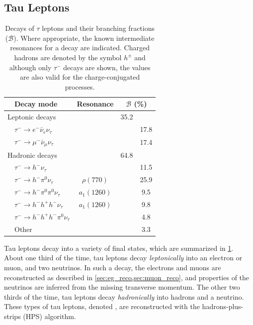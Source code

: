 \subsection{Tau Leptons}\label{sec:tau_reco}
\begin{table}
  \centering
  \begin{tabular}{llccc}
          \toprule
          & Decay mode & Resonance & \multicolumn{2}{c}{$\mathcal{B}$ (\%)} \\ 
          \midrule
          \multicolumn{2}{l}{Leptonic decays} & & 35.2 & \\
          & $\tau^- \to e^- \bar{\nu}_e \nu_\tau$ & & & 17.8 \\
          & $\tau^- \to \mu^- \bar{\nu}_\mu \nu_\tau$ & & & 17.4 \\
          \midrule
          \multicolumn{2}{l}{Hadronic decays} & & 64.8 & \\
          & $\tau^- \to h^- \nu_\tau$ & & & 11.5 \\
          & $\tau^- \to h^- \pi^0 \nu_\tau$ & $\rho(770)$ & & 25.9 \\
          & $\tau^- \to h^- \pi^0 \pi^0 \nu_\tau$ & $a_1(1260)$ & & 9.5 \\
          & $\tau^- \to h^-h^+h^ -\nu_\tau$ & $a_1(1260)$ & & 9.8 \\
          & $\tau^- \to h^-h^+h^- \pi^0 \nu_\tau$ & & & 4.8 \\
          & Other & & & 3.3 \\
          \bottomrule
  \end{tabular}
  \caption[Tau Lepton Decays and Branching Fractions]{Decays of $\tau$ leptons and their branching fractions ($\mathcal{B}$). Where appropriate, the known intermediate resonances for a decay are indicated. Charged hadrons are denoted by the symbol $h^\pm$ and although only $\tau^-$ decays are shown, the values are also valid for the charge-conjugated processes.}\label{tab:tau_decays}
\end{table}

Tau leptons decay into a variety of final states, which are summarized in \cref{tab:tau_decays}. About one third of the time, tau leptons decay \textit{leptonically} into an electron or muon, and two neutrinos. In such a decay, the electrons and muons are reconstructed as described in \cref{sec:eg_reco,sec:muon_reco}, and properties of the neutrinos are inferred from the missing transverse momentum. The other two thirds of the time, tau leptons decay \textit{hadronically} into hadrons and a neutrino. These types of tau leptons, denoted \tauh, are reconstructed with the hadrons-plus-strips (HPS) algorithm. 

